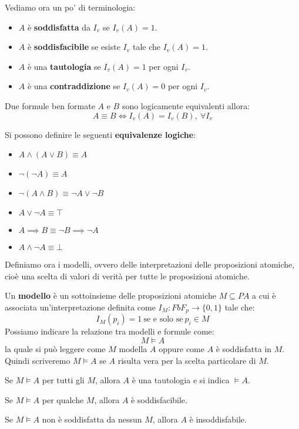 Vediamo ora un po' di terminologia:
\begin{itemize}
    \item $A$ è \textbf{soddisfatta} da $I_v$ se $I_v(A) = 1$.
    \item $A$ è \textbf{soddisfacibile} se esiste $I_v$ tale che $I_v(A) = 1$.
    \item $A$ è una \textbf{tautologia} se $I_v(A) = 1$ per ogni $I_v$.
    \item $A$ è una \textbf{contraddizione} se $I_v(A) = 0$ per ogni $I_v$.
\end{itemize}
\begin{definizione}
    Due formule ben formate $A$ e $B$ sono logicamente equivalenti allora:
    \begin{equation}
        A \equiv B \iff I_v(A) = I_v(B), \ \forall I_v
    \end{equation}
\end{definizione}
Si possono definire le seguenti \textbf{equivalenze logiche}:
\begin{itemize}
    \item $A \land (A \lor B) \equiv A$
    \item $\lnot (\lnot A) \equiv A$
    \item $\lnot (A \land B) \equiv \lnot A \lor \lnot B$
    \item $A \lor \lnot A \equiv \top$
    \item $A \implies B \equiv \lnot B \implies \lnot A$
    \item $A \land \lnot A \equiv \bot$
\end{itemize}
Definiamo ora i modelli, ovvero delle interpretazioni delle proposizioni
atomiche, cioè una scelta di valori di verità per tutte le proposizioni atomiche.
\begin{definizione}
    Un \textbf{modello} è un sottoinsieme delle proposizioni atomiche $M
        \subseteq PA$ a cui è associata un'interpretazione definita come $I_M:
        FbF_p \to \{0, 1\}$ tale che:
    \begin{equation}
        I_M(p_i) = 1 \ \text{se e solo se} \ p_i \in M
    \end{equation}
    Possiamo indicare la relazione tra modelli e formule come:
    \begin{equation}
        M \models A
    \end{equation}
    la quale si può leggere come $M$ modella $A$ oppure come $A$ è soddisfatta
    in $M$. Quindi scriveremo $M \models A$ se $A$ risulta vera per la scelta
    particolare di $M$.
\end{definizione}
\begin{definizione}
    Se $M \models A$ per tutti gli $M$, allora $A$ è una tautologia e si indica
    $\models A$.
\end{definizione}
\begin{definizione}
    Se $M \models A$ per qualche $M$, allora $A$ è soddisfacibile.
\end{definizione}
\begin{definizione}
    Se $M \models A$ non è soddisfatta da nessun $M$, allora $A$ è insoddisfabile.
\end{definizione}
